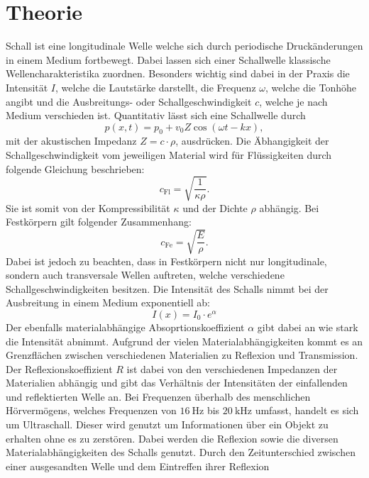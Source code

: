 \section{Theorie}
\label{sec:Theorie}
Schall ist eine longitudinale Welle welche sich durch periodische Druckänderungen in einem Medium fortbewegt. Dabei lassen sich einer Schallwelle klassische Wellencharakteristika
zuordnen. Besonders wichtig sind dabei in der Praxis die Intensität $I$, welche die Lautstärke darstellt, die Frequenz $\omega$, welche die Tonhöhe angibt und die Ausbreitungs- oder
Schallgeschwindigkeit $c$, welche je nach Medium verschieden ist. Quantitativ lässt sich eine Schallwelle durch
\begin{equation}
  p(x,t) = p_0 + v_0 Z \cos(\omega t - k x),
\end{equation}
mit der akustischen Impedanz $Z=c\cdot\rho$, ausdrücken. Die Äbhangigkeit der Schallgeschwindigkeit vom jeweiligen Material wird für Flüssigkeiten durch folgende Gleichung beschrieben:
\begin{equation}
  c_\text{Fl} = \sqrt{\frac{1}{\kappa \rho}}.
\end{equation}
Sie ist somit von der Kompressibilität $\kappa$ und der Dichte $\rho$ abhängig.
Bei Festkörpern gilt folgender Zusammenhang:
\begin{equation}
  c_\text{Fe} = \sqrt{\frac{E}{\rho}}.
\end{equation}
Dabei ist jedoch zu beachten, dass in Festkörpern nicht nur longitudinale, sondern auch transversale Wellen auftreten, welche verschiedene Schallgeschwindigkeiten besitzen.
Die Intensität des Schalls nimmt bei der Ausbreitung in einem Medium exponentiell ab:
\begin{equation}
  I(x)= I_0 \cdot e^{\alpha}
\end{equation}
Der ebenfalls materialabhängige Absoprtionskoeffizient $\alpha$ gibt dabei an wie stark die Intensität abnimmt.
Aufgrund der vielen Materialabhängigkeiten kommt es an Grenzflächen zwischen verschiedenen Materialien zu Reflexion und Transmission.
Der Reflexionskoeffizient $R$ ist dabei von den verschiedenen Impedanzen der Materialien abhängig und gibt das Verhältnis der Intensitäten der einfallenden und reflektierten Welle an.
Bei Frequenzen überhalb des menschlichen Hörvermögens, welches Frequenzen von $\SI{16}{\hertz}$ bis
$\SI{20}{\kilo\hertz}$ umfasst, handelt es sich um Ultraschall. Dieser wird genutzt um Informationen über ein Objekt zu erhalten ohne es zu zerstören.
Dabei werden die Reflexion sowie die diversen Materialabhängigkeiten des Schalls genutzt. Durch den Zeitunterschied zwischen einer ausgesandten Welle und dem Eintreffen ihrer Reflexion
